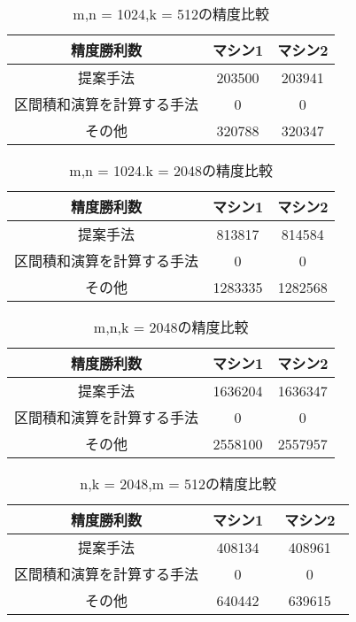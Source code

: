 \documentclass[11pt,a4paper]{jsreport}
\theoremstyle{definition}
\begin{document}
\begin{table}[H]
\centering
\small
\caption{m,n = 1024,k = 512の精度比較}
\begin{tabular}{c|c|c}
\hline
精度勝利数 & マシン1 & マシン2 \\ \hline \hline
提案手法 & 203500 & 203941 \\ \hline
区間積和演算を計算する手法 & 0 & 0 \\ \hline
その他 & 320788 & 320347 \\ \hline
\end{tabular}
\end{table}

\begin{table}[H]
\centering
\small
\caption{m,n = 1024.k = 2048の精度比較}
\begin{tabular}{c|c|c}
\hline
精度勝利数 & マシン1 & マシン2 \\ \hline \hline
提案手法 & 813817 & 814584 \\ \hline
区間積和演算を計算する手法 & 0 & 0 \\ \hline
その他 & 1283335 & 1282568 \\ \hline
\end{tabular}
\end{table}

\begin{table}[H]
\centering
\small
\caption{m,n,k = 2048の精度比較}
\begin{tabular}{c|c|c}
\hline
精度勝利数 & マシン1 & マシン2 \\ \hline \hline
提案手法 & 1636204 & 1636347 \\ \hline
区間積和演算を計算する手法 & 0 & 0 \\ \hline
その他 & 2558100 & 2557957 \\ \hline
\end{tabular}
\end{table}

\begin{table}[H]
\centering
\small
\caption{n,k = 2048,m = 512の精度比較}
\begin{tabular}{c|c|c}
\hline
精度勝利数 & マシン1 & マシン2　\\ \hline \hline
提案手法 & 408134 & 408961 \\ \hline
区間積和演算を計算する手法 & 0 & 0 \\ \hline
その他 & 640442 & 639615 \\ \hline
\end{tabular}
\end{table}
\end{document}
